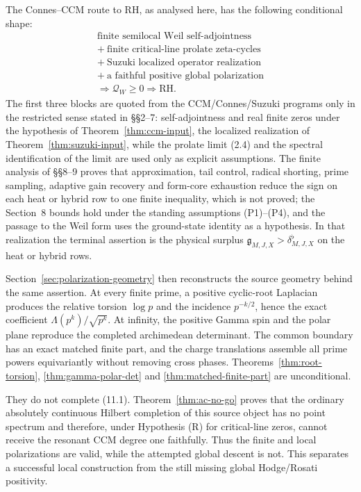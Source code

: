 \documentclass[11pt]{amsart}
\theoremstyle{definition}
\theoremstyle{remark}
\newcommand{\RH}{\mathrm{RH}}
\newcommand{\QW}{\mathcal Q_W}
\begin{document}
The Connes--CCM route to RH, as analysed here, has the following conditional
shape:
\[
\boxed{
\begin{gathered}
\text{finite semilocal Weil self-adjointness}\\
+\ \text{finite critical-line prolate zeta-cycles}\\
+\ \text{Suzuki localized operator realization}\\
+\ \text{a faithful positive global polarization}\\
\Longrightarrow \QW\ge0
\Longrightarrow \RH .
\end{gathered}}
\tag{11.1}
\]
The first three blocks are quoted from the
CCM/Connes/Suzuki programs only in the restricted sense stated in
\S\S2--7: self-adjointness and real finite zeros under the hypothesis of
Theorem~\ref{thm:ccm-input}, the localized realization of
Theorem~\ref{thm:suzuki-input}, while the prolate limit (2.4) and the
spectral identification of the limit are used only as explicit
assumptions.  The finite analysis of \S\S8--9 proves that approximation,
tail control, radical shorting, prime sampling, adaptive gain recovery and
form-core exhaustion reduce the sign on each heat or hybrid row to one
finite inequality, which is not proved; the Section~8 bounds hold under
the standing assumptions (P1)--(P4), and the passage to the Weil form
uses the ground-state identity as a hypothesis.  In that realization
the terminal assertion is the physical surplus
\(\mathfrak g_{M,J,X}>\delta^{\flat}_{M,J,X}\) on the heat or hybrid rows.

Section~\ref{sec:polarization-geometry} then reconstructs the source geometry
behind the same assertion.  At every finite prime, a positive cyclic-root
Laplacian produces the relative torsion \(\log p\) and the incidence
\(p^{-k/2}\), hence the exact coefficient
\(\Lambda(p^k)/\sqrt{p^k}\).  At infinity, the positive Gamma spin and the
polar plane reproduce the completed archimedean determinant.  The common
boundary has an exact matched finite part, and the charge translations
assemble all prime powers equivariantly without removing cross phases.
Theorems~\ref{thm:root-torsion}, \ref{thm:gamma-polar-det} and
\ref{thm:matched-finite-part} are unconditional.

They do not complete (11.1).  Theorem~\ref{thm:ac-no-go} proves that the
ordinary absolutely continuous Hilbert completion of this source object
has no point spectrum and therefore, under Hypothesis (R) for
critical-line zeros, cannot receive the resonant CCM degree one faithfully.  Thus the finite and local polarizations are valid, while
the attempted global descent is not.  This separates a successful local
construction from the still missing global Hodge/Rosati positivity.
\end{document}
